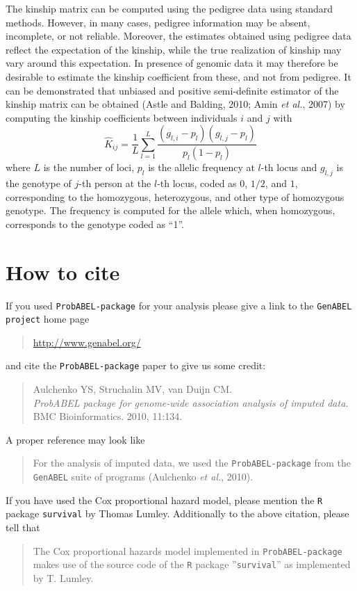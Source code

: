 \documentclass[12pt,a4paper]{article}
\newcommand{\PA}{\texttt{ProbABEL-package}}
\begin{document}
The kinship matrix can be computed using the pedigree data using standard methods.
However, in many cases, pedigree information may be absent, incomplete, or not
reliable. Moreover, the estimates obtained using pedigree data reflect the
expectation of the kinship, while the true realization of kinship may vary
around this expectation. In presence of genomic data it may therefore be
desirable to estimate the kinship coefficient from these, and not from pedigree.
It can be demonstrated that unbiased and positive semi-definite estimator
of the kinship matrix can be obtained (Astle and Balding, 2010; Amin \emph{et al.}, 2007)
by computing the kinship coefficients between individuals $i$ and $j$ with
$$
\hat{K}_{ij} = \frac{1}{L} \sum_{l=1}^L \frac{ (g_{l,i} - p_l) (g_{l,j} - p_l) }{ p_l (1-p_l) }
$$
where $L$ is the number of loci, $p_l$ is the allelic frequency at $l$-th locus
and $g_{l,j}$ is the genotype of $j$-th person at the $l$-th locus, coded
as $0$, $1/2$, and $1$, corresponding to the homozygous, heterozygous, and
other type of homozygous genotype. The frequency is computed for the allele
which, when homozygous, corresponds to the genotype coded as ``1''.


\section{How to cite}

If you used \PA{} for
your analysis please give a link to the \texttt{GenABEL project} home
page

\begin{quote}
\url{http://www.genabel.org/}
\end{quote}
and cite the \PA{} paper to give us some credit:
\begin{quote}
Aulchenko YS, Struchalin MV, van Duijn CM.\\
\emph{ProbABEL package for genome-wide association analysis of imputed data.}\\
BMC Bioinformatics. 2010, 11:134.
\end{quote}
A proper reference may look like
\begin{quote}
For the analysis of imputed data, we used the \PA{} 
from the \texttt{GenABEL} suite of programs (Aulchenko \emph{et al.}, 2010).
\end{quote}

If you have used the Cox proportional hazard model, please mention the
\texttt{R} package \texttt{survival} by Thomas Lumley. Additionally
to the above citation, please tell that
\begin{quote}
The Cox proportional hazards model implemented in \PA{}
makes use of the source code of the \texttt{R} package ''\texttt{survival}''
as implemented by T. Lumley.
\end{quote}
\end{document}
